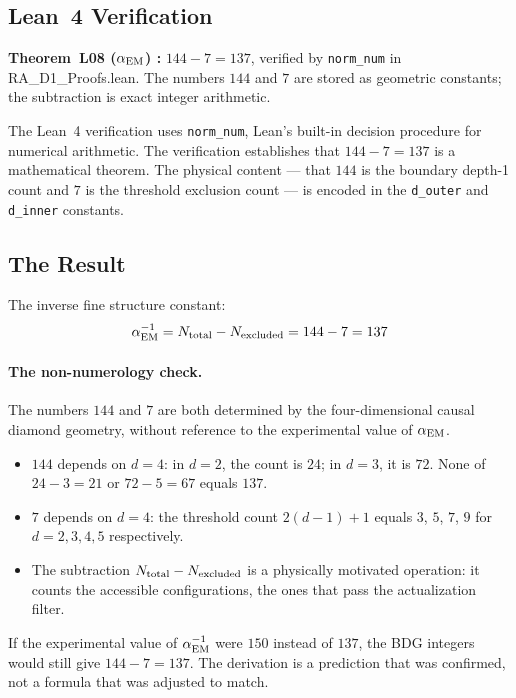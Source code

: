 \documentclass[12pt,a4paper]{article}
\begin{document}
\subsection{Lean~4 Verification}

\begin{leanbox}
\textbf{Theorem~L08 ($\alpha_{\rm EM}$) \statusLV:} $144-7=137$, verified by \texttt{norm\_num} in RA\_D1\_Proofs.lean.  The numbers $144$ and $7$ are stored as geometric constants; the subtraction is exact integer arithmetic.
\end{leanbox}

The Lean~4 verification uses \texttt{norm\_num}, Lean's built-in decision procedure for numerical arithmetic.  The verification establishes that $144-7=137$ is a mathematical theorem.  The physical content --- that $144$ is the boundary depth-1 count and $7$ is the threshold exclusion count --- is encoded in the \texttt{d\_outer} and \texttt{d\_inner} constants.

\subsection{The Result}

The inverse fine structure constant:
\begin{equation}
  \alpha_{\rm EM}^{-1} = N_{\rm total} - N_{\rm excluded} = 144 - 7 = 137
  \label{eq:alphaEM}
\end{equation}

\paragraph{The non-numerology check.}  The numbers $144$ and $7$ are both determined by the four-dimensional causal diamond geometry, without reference to the experimental value of $\alpha_{\rm EM}$.
\begin{itemize}
  \item $144$ depends on $d=4$: in $d=2$, the count is $24$; in $d=3$, it is $72$.  None of $24-3=21$ or $72-5=67$ equals $137$.
  \item $7$ depends on $d=4$: the threshold count $2(d-1)+1$ equals $3$, $5$, $7$, $9$ for $d=2,3,4,5$ respectively.
  \item The subtraction $N_{\rm total}-N_{\rm excluded}$ is a physically motivated operation: it counts the accessible configurations, the ones that pass the actualization filter.
\end{itemize}
If the experimental value of $\alpha_{\rm EM}^{-1}$ were $150$ instead of $137$, the BDG integers would still give $144-7=137$.  The derivation is a prediction that was confirmed, not a formula that was adjusted to match.
\end{document}
